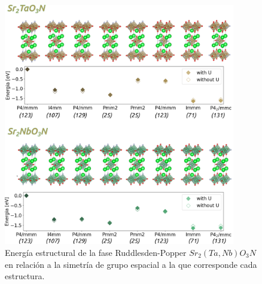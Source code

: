 \begin{figure}[H]
    \centering
    \includegraphics[width=0.9\textwidth]{Figs/rp_ta-nb_eU.png}
    \caption{Energía estructural de la fase Ruddlesden-Popper $Sr_{2}(Ta,Nb)O_{3}N$ en relación a la simetría de grupo espacial a la que corresponde cada estructura.}
    \label{Fig. rp_ta-nb_eU}
\end{figure}







